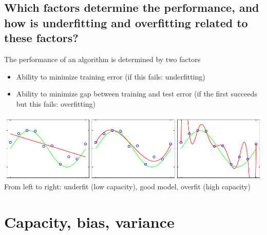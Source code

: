 \subsection{Which factors determine the performance, and how is underfitting and overfitting related to these factors?}
The performance of an algorithm is determined by two factors
\begin{itemize}
\item Ability to minimize training error (if this fails: underfitting)
\item Ability to minimize gap between training and test error (if the first succeeds but this fails: overfitting)
\end{itemize}
\includegraphics[width=\textwidth]{./img/overfit.png}
From left to right: underfit (low capacity), good model, overfit (high capacity)
%
\section{Capacity, bias, variance}
